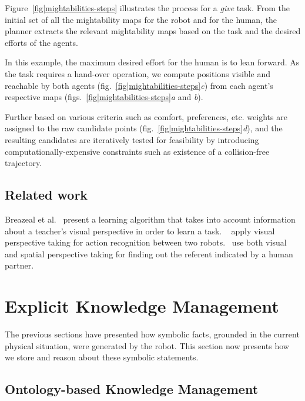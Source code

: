 \documentclass{svmult}
\begin{document}
Figure~\ref{fig|mightabilities-steps} illustrates the process for a \emph{give}
task. From the initial set of all the mightability maps for the robot and for
the human, the planner extracts the relevant mightability maps based on the
task and the desired efforts of the agents.

In this example, the maximum desired effort for the human is to lean forward.
As the task requires a hand-over operation, we compute positions visible and
reachable by both agents (fig.~\ref{fig|mightabilities-steps}{\it c}) from
each agent's respective maps (figs.~\ref{fig|mightabilities-steps}{\it a} and
{\it b}).

Further based on various criteria such as comfort, preferences, etc. weights
are assigned to the raw candidate points
(fig.~\ref{fig|mightabilities-steps}{\it d}), and the resulting candidates are
iteratively tested for feasibility by introducing computationally-expensive
constraints such as existence of a collision-free trajectory.

\subsection{Related work}

Breazeal et al.~\cite{breazeal2006} present a learning algorithm that takes
into account information about a teacher's visual perspective in order to learn
a task.  ~\cite{Johnson2005} apply visual perspective taking for action
recognition between two robots.~\cite{Trafton2005} use both visual and spatial
perspective taking for finding out the referent indicated by a human partner.


\section{Explicit Knowledge Management}
\label{cognitivekernel}

The previous sections have presented how symbolic facts, grounded in the
current physical situation, were generated by the robot. This section now
presents how we store and reason about these symbolic statements.

\subsection{Ontology-based Knowledge Management}
\end{document}

